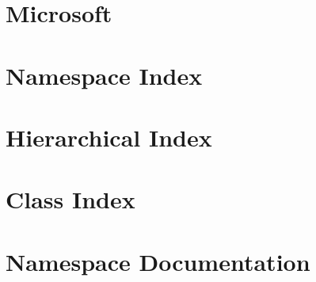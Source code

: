\let\mypdfximage\pdfximage\def\pdfximage{\immediate\mypdfximage}\documentclass[twoside]{book}
\newcommand{\+}{\discretionary{\mbox{\scriptsize$\hookleftarrow$}}{}{}}
\begin{document}
\chapter{Microsoft}
\label{md_Packages_Microsoft_8NetFramework_8Analyzers_82_89_84_documentation_Microsoft_8NetFramework_8Analyzers}

\chapter{Namespace Index}

\chapter{Hierarchical Index}

\chapter{Class Index}

\chapter{Namespace Documentation}

















\end{document}
